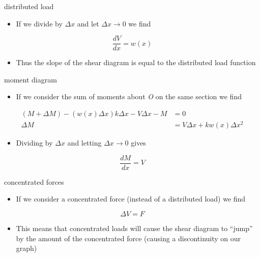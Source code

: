 \begin{frame}{distributed load}
\protect\hypertarget{distributed-load-2}{}
\begin{itemize}
\tightlist
\item
  If we divide by \(\Delta x\) and let \(\Delta x \to 0\) we find
\end{itemize}

\[\frac{dV}{dx} = w(x)\]

\begin{itemize}
\tightlist
\item
  Thus the slope of the shear diagram is equal to the distributed load
  function
\end{itemize}
\end{frame}

\begin{frame}{moment diagram}
\protect\hypertarget{moment-diagram}{}
\begin{itemize}
\tightlist
\item
  If we consider the sum of moments about \emph{O} on the same section
  we find
\end{itemize}

\[\begin{aligned}
  (M + \Delta M) - (w(x)\Delta x)k \Delta x - V\Delta x - M &= 0\\
  \Delta M &= V \Delta x + k w(x) \Delta x ^2
\end{aligned}\]

\begin{itemize}
\tightlist
\item
  Dividing by \(\Delta x\) and letting \(\Delta x \to 0\) gives
\end{itemize}

\[\frac{dM}{dx} = V\]
\end{frame}

\begin{frame}{concentrated forces}
\protect\hypertarget{concentrated-forces}{}
\begin{itemize}
\tightlist
\item
  If we consider a concentrated force (instead of a distributed load) we
  find
\end{itemize}

\[\Delta V = F \]

\begin{itemize}
\tightlist
\item
  This means that concentrated loads will cause the shear diagram to
  ``jump'' by the amount of the concentrated force (causing a
  discontinuity on our graph)
\end{itemize}
\end{frame}

